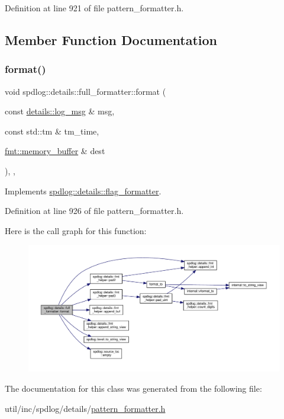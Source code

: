 Definition at line 921 of file pattern\+\_\+formatter.\+h.



\subsection{Member Function Documentation}
\mbox{\label{classspdlog_1_1details_1_1full__formatter_a11da1d2ec8378841d228df071915da35}} 
\subsubsection{\texorpdfstring{format()}{format()}}
{\footnotesize\ttfamily void spdlog\+::details\+::full\+\_\+formatter\+::format (\begin{DoxyParamCaption}\item[{const \hyperlink{structspdlog_1_1details_1_1log__msg}{details\+::log\+\_\+msg} \&}]{msg,  }\item[{const std\+::tm \&}]{tm\+\_\+time,  }\item[{\hyperlink{format_8h_a21cbf729f69302f578e6db21c5e9e0d2}{fmt\+::memory\+\_\+buffer} \&}]{dest }\end{DoxyParamCaption})\hspace{0.3cm}{\ttfamily [inline]}, {\ttfamily [override]}, {\ttfamily [virtual]}}



Implements \hyperlink{classspdlog_1_1details_1_1flag__formatter_a33fb3e42a4c8200cceb833d92b53fb67}{spdlog\+::details\+::flag\+\_\+formatter}.



Definition at line 926 of file pattern\+\_\+formatter.\+h.

Here is the call graph for this function\+:
\nopagebreak
\begin{figure}[H]
\begin{center}
\leavevmode
\includegraphics[width=350pt]{classspdlog_1_1details_1_1full__formatter_a11da1d2ec8378841d228df071915da35_cgraph}
\end{center}
\end{figure}


The documentation for this class was generated from the following file\+:\begin{DoxyCompactItemize}
\item 
util/inc/spdlog/details/\hyperlink{pattern__formatter_8h}{pattern\+\_\+formatter.\+h}\end{DoxyCompactItemize}
